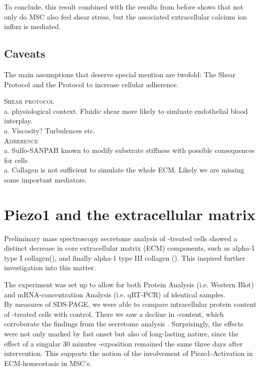 To conclude, this result combined with the results from before shows that not only do MSC also feel shear stress, but the associated extracellular calcium ion influx is \Piezo mediated. 

\subsection{Caveats}
The main assumptions that deserve special mention are twofold: The Shear Protocol and the Protocol to increase cellular adherence. \par

\textsc{Shear protocol}\\
a. physiological context. Fluidic shear more likely to simluate endothelial blood interplay.\\
a. Viscosity? Turbulences etc.\\
\textsc{Adherence}\\
a. Sulfo-SANPAH known to modify substrate stiffness with possible consequences for cells\\
a. Collagen is not sufficient to simulate the whole ECM. Likely we are missing some important mediators.

\section{Piezo1 and the extracellular matrix}

Preliminary mass spectroscopy secretome analysis of \Yoda-treated cells showed a distinct decrease in core extracellular matrix (ECM) components, such as alpha-1 type I collagen(\colone),  and finally alpha-1 type III collagen (\colthree).
This inspired further investigation into this matter.\par

The experiment was set up to allow for both Protein Analysis (i.e. Western Blot) and mRNA-concentration Analysis (i.e. qRT-PCR) of identical samples.\\
By measures of SDS-PAGE, we were able to compare intracellular protein content of \Yoda-treated cells with control. There we saw a  decline in \colone-content, which corroborate the findings from the secretome analysis . Surprisingly, the effects were not only marked by fast onset but also of long-lasting nature, since the effect of a singular 30 minutes \Yoda-exposition remained the same three days after intervention. This supports the notion of the involvement of Piezo1-Activation in ECM-homeostasis in MSC's. \par

